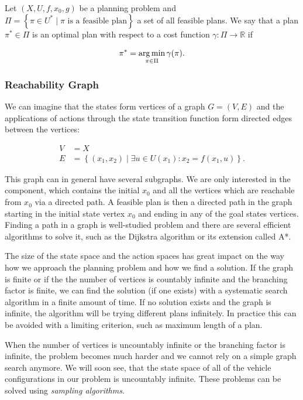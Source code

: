 \begin{defn}
	Let $\left(X, U, f, x_0, g\right)$ be a planning problem and $\Pi=\left\{\pi\in U^* \mid \pi \text{ is a feasible plan}\right\}$ a set of all feasible plans. We say that a plan $\pi^*\in \Pi$ is an optimal plan with respect to a cost function $\gamma: \Pi \rightarrow \mathbb{R}$ if
	
	\[
		\pi^*=\operatorname*{arg\,min}_{\pi\in\Pi} \gamma(\pi).
	\]
\end{defn}

\subsubsection{Reachability Graph}

We can imagine that the states form vertices of a graph $G=(V, E)$ and the applications of actions through the state transition function form directed edges between the vertices:

\begin{equation*}
\begin{aligned}
	V&=X \\
	E&=\left\{(x_1, x_2) \mid \exists u \in U(x_1): x_2 = f(x_1, u) \right\}.
\end{aligned}
\end{equation*}

This graph can in general have several subgraphs. We are only interested in the component, which contains the initial $x_0$ and all the vertices which are reachable from $x_0$ via a directed path. A feasible plan is then a directed path in the graph starting in the initial state vertex $x_0$ and ending in any of the goal states vertices. Finding a path in a graph is well-studied problem and there are several efficient algorithms to solve it, such as the Dijkstra algorithm or its extension called A*.

The size of the state space and the action spaces has great impact on the way how we approach the planning problem and how we find a solution. If the graph is finite or if the the number of vertices is countably infinite and the branching factor is finite, we can find the solution (if one exists) with a systematic search algorithm in a finite amount of time. If no solution exists and the graph is infinite, the algorithm will be trying different plans infinitely. In practice this can be avoided with a limiting criterion, such as maximum length of a plan.

When the number of vertices is uncountably infinite or the branching factor is infinite, the problem becomes much harder and we cannot rely on a simple graph search anymore. We will soon see, that the state space of all of the vehicle configurations in our problem is uncountably infinite. These problems can be solved using \textit{sampling algorithms}.


